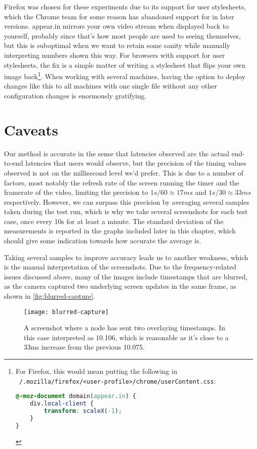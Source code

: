 Firefox was chosen for these experiments due to its support for user stylesheets, which the Chrome team for some reason has abandoned support for in later versions. appear.in mirrors your own video stream when displayed back to yourself, probably since that's how most people are used to seeing themselves, but this is suboptimal when we want to retain some sanity while manually interpreting numbers shown this way. For browsers with support for user stylesheets, the fix is a simple matter of writing a stylesheet that flips your own image back\cprotect\footnote{For Firefox, this would mean putting the following in \texttt{~/.mozilla/firefox/<user-profile>/chrome/userContent.css}:
\begin{lstlisting}[language=CSS]
@-moz-document domain(appear.in) {
    div.local-client {
        transform: scaleX(-1);
    }
}
\end{lstlisting}}. When working with several machines, having the option to deploy changes like this to all machines with one single file without any other configuration changes is enormously gratifying.


\section{Caveats}

Our method is accurate in the sense that latencies observed are the actual end-to-end latencies that users would observe, but the precision of the timing values observed is not on the millisecond level we'd prefer. This is due to a number of factors, most notably the refresh rate of the screen running the timer and the framerate of the video, limiting the precision to $1s/60\approx17ms$ and $1s/30\approx33ms$ respectively. However, we can surpass this precision by averaging several samples taken during the test run, which is why we take several screenshots for each test case, once every 10s for at least a minute. The standard deviation of the measurements is reported in the graphs included later in this chapter, which should give some indication towards how accurate the average is.

Taking several samples to improve accuracy leads us to another weakness, which is the manual interpretation of the screenshots. Due to the frequency-related issues discussed above, many of the images include timestamps that are blurred, as the camera captured two underlying screen updates in the same frame, as shown in \autoref{fig:blurred-capture}.

\begin{figure}
    \centering
    \texttt{[image: blurred-capture]}
    \caption{A screenshot where a node has sent two overlaying timestamps. In this case interpreted as 10.106, which is reasonable as it's close to a 33ms increase from the previous 10.075.}
    \label{fig:blurred-capture}
\end{figure}

